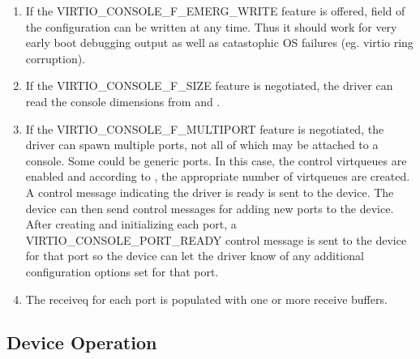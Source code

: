 \begin{enumerate}
\item If the VIRTIO_CONSOLE_F_EMERG_WRITE feature is offered,
   field of the configuration can be written at any time.
  Thus it should work for very early boot debugging output as well as
  catastophic OS failures (eg. virtio ring corruption).

\item If the VIRTIO_CONSOLE_F_SIZE feature is negotiated, the driver
  can read the console dimensions from  and .

\item If the VIRTIO_CONSOLE_F_MULTIPORT feature is negotiated, the
  driver can spawn multiple ports, not all of which may be
  attached to a console. Some could be generic ports. In this
  case, the control virtqueues are enabled and according to
  , the appropriate number
  of virtqueues are created. A control message indicating the
  driver is ready is sent to the device. The device can then send
  control messages for adding new ports to the device. After
  creating and initializing each port, a
  VIRTIO_CONSOLE_PORT_READY control message is sent to the device
  for that port so the device can let the driver know of any additional
  configuration options set for that port.

\item The receiveq for each port is populated with one or more
  receive buffers.
\end{enumerate}

\subsection{Device Operation}\label{sec:Device Types / Console Device / Device Operation}

